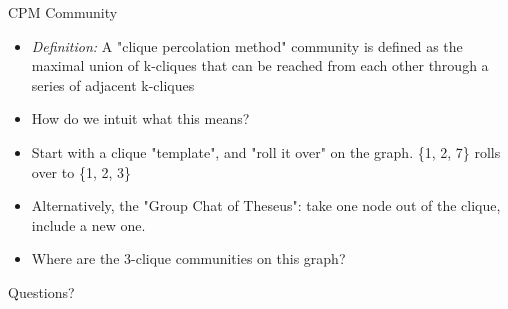 \documentclass[aspectratio=169, handout]{beamer}
\begin{document}
\begin{frame}{CPM Community}
\begin{figure}
\centering
{}
\end{figure}
\begin{itemize}
\item \textit{Definition:} A "clique percolation method" community is defined as the maximal union of k-cliques that can be reached from each other through a series of adjacent k-cliques
\item How do we intuit what this means?
\pause
\item Start with a clique "template", and "roll it over" on the graph. \{1, 2, 7\} rolls over to \{1, 2, 3\}
\pause
\item Alternatively, the "Group Chat of Theseus": take one node out of the clique, include a new one.
\pause
\item Where are the 3-clique communities on this graph?
\pause
\end{itemize}
\end{frame}

\begin{frame}{}
      \begin{center}
    {\color{sigma@mainblue} \LARGE Questions?}
  \end{center}
\end{frame}
\end{document}
